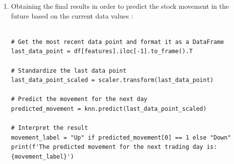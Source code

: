 \documentclass[12pt,a4paper]{report}
\begin{document}
\begin{enumerate}
\begin{verbatim}
print(f'Accuracy: {accuracy:.2f}')
print(f'Precision: {precision:.2f}')
print(f'Recall: {recall:.2f}')
print(f'F1-Score: {f1:.2f}')

# Detailed classification report
print("\nClassification Report:\n", classification_report(y_test, y_pred))

\end{verbatim}

\item Obtaining the final results in order to predict the stock movement in the future based on the current data values :
\begin{verbatim}

# Get the most recent data point and format it as a DataFrame
last_data_point = df[features].iloc[-1].to_frame().T

# Standardize the last data point
last_data_point_scaled = scaler.transform(last_data_point)

# Predict the movement for the next day
predicted_movement = knn.predict(last_data_point_scaled)

# Interpret the result
movement_label = "Up" if predicted_movement[0] == 1 else "Down"
print(f'The predicted movement for the next trading day is: 
{movement_label}')

\end{verbatim}
\end{enumerate}
\end{document}
